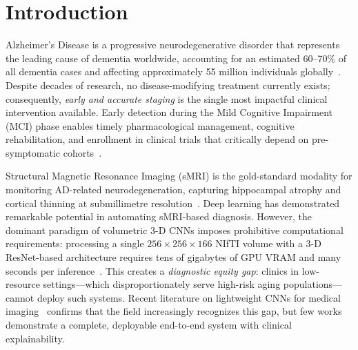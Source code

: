\documentclass[conference]{IEEEtran}
\begin{document}
\section{Introduction}
\label{sec:intro}

Alzheimer's Disease is a progressive neurodegenerative disorder
that represents the leading cause of dementia worldwide,
accounting for an estimated 60--70\% of all dementia cases and
affecting approximately 55 million individuals
globally~\cite{who2023}. Despite decades of research, no
disease-modifying treatment currently exists; consequently,
\emph{early and accurate staging} is the single most impactful
clinical intervention available. Early detection during the Mild
Cognitive Impairment (MCI) phase enables timely pharmacological
management, cognitive rehabilitation, and enrollment in clinical
trials that critically depend on pre-symptomatic
cohorts~\cite{jack2018}.

Structural Magnetic Resonance Imaging (sMRI) is the
gold-standard modality for monitoring AD-related
neurodegeneration, capturing hippocampal atrophy and cortical
thinning at submillimetre resolution~\cite{fischl2012}. Deep
learning has demonstrated remarkable potential in automating
sMRI-based diagnosis. However, the dominant paradigm of
volumetric 3-D CNNs imposes prohibitive computational
requirements: processing a single $256\!\times\!256\!\times\!166$
NIfTI volume with a 3-D ResNet-based architecture requires tens
of gigabytes of GPU VRAM and many seconds per
inference~\cite{zhang2021}. This creates a \emph{diagnostic
equity gap}: clinics in low-resource settings---which
disproportionately serve high-risk aging populations---cannot
deploy such systems. Recent literature on lightweight CNNs for
medical imaging~\cite{li2025bench} confirms that the field
increasingly recognizes this gap, but few works demonstrate a
complete, deployable end-to-end system with clinical
explainability.
\end{document}
